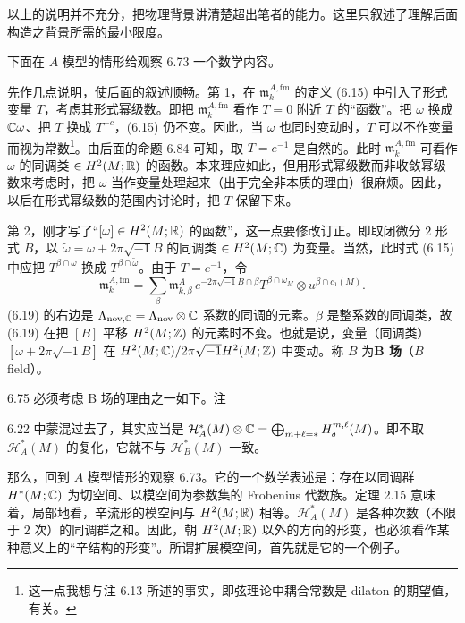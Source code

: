 以上的说明并不充分，把物理背景讲清楚超出笔者的能力。这里只叙述了理解后面构造之背景所需的最小限度。

下面在 $A$ 模型的情形给观察 6.73 一个数学内容。

先作几点说明，使后面的叙述顺畅。第 1，在 $\mathfrak{m}_k^{A,\mathrm{fm}}$ 的定义 (6.15) 中引入了形式变量 $T$，考虑其形式幂级数。即把 $\mathfrak{m}_k^{A,\mathrm{fm}}$ 看作 $T=0$ 附近 $T$ 的“函数”。把 $\omega$ 换成 $\mathbb{C}\omega$、把 $T$ 换成 $T^{-c}$，(6.15) 仍不变。因此，当 $\omega$ 也同时变动时，$T$ 可以不作变量而视为常数\footnote{这一点我想与注 6.13 所述的事实，即弦理论中耦合常数是 dilaton 的期望值，有关。}。由后面的命题 6.84 可知，取 $T=e^{-1}$ 是自然的。此时 $\mathfrak{m}_k^{A,\mathrm{fm}}$ 可看作 $\omega$ 的同调类 $\in H^2(M;\mathbb{R})$ 的函数。本来理应如此，但用形式幂级数而非收敛幂级数来考虑时，把 $\omega$ 当作变量处理起来（出于完全非本质的理由）很麻烦。因此，以后在形式幂级数的范围内讨论时，把 $T$ 保留下来。

第 2，刚才写了“$[\omega]\in H^2(M;\mathbb{R})$ 的函数”，这一点要修改订正。即取闭微分 $2$ 形式 $B$，以 $\tilde\omega=\omega+2\pi\sqrt{-1}B$ 的同调类 $\in H^2(M;\mathbb{C})$ 为变量。当然，此时式 (6.15) 中应把 $T^{\beta\cap\omega}$ 换成 $T^{\beta\cap\tilde\omega}$。由于 $T=e^{-1}$，令
\begin{equation}
  \mathfrak{m}_k^{A,\mathrm{fm}}
  =\sum_\beta\mathfrak{m}_{k,\beta}^A\,
  e^{-2\pi\sqrt{-1}B\cap\beta}T^{\beta\cap\omega_M}\otimes u^{\beta\cap c_1(M)} . \tag{6.19}
\end{equation}
(6.19) 的右边是 $\Lambda_{\mathrm{nov},\mathbb{C}}=\Lambda_{\mathrm{nov}}\otimes\mathbb{C}$ 系数的同调的元素。$\beta$ 是整系数的同调类，故 (6.19) 在把 $[B]$ 平移 $H^2(M;\mathbb{Z})$ 的元素时不变。也就是说，变量（同调类）$[\omega+2\pi\sqrt{-1}B]$ 在 $H^2(M;\mathbb{C})/2\pi\sqrt{-1}H^2(M;\mathbb{Z})$ 中变动。称 $B$ 为\textbf{B 场}（$B$ field）。

\begin{remark}{6.75}
  必须考虑 B 场的理由之一如下。注

  6.22 中蒙混过去了，其实应当是 $\mathcal{H}_A^*(M)\otimes\mathbb{C}=\bigoplus_{m+\ell=*}H_\delta^{m,\ell}(M)$。即不取 $\mathcal{H}_A^*(M)$ 的复化，它就不与 $\mathcal{H}_B^*(M)$ 一致。
\end{remark}

那么，回到 $A$ 模型情形的观察 6.73。它的一个数学表述是：存在以同调群 $H^*(M;\mathbb{C})$ 为切空间、以模空间为参数集的 Frobenius 代数族。定理 2.15 意味着，局部地看，辛流形的模空间与 $H^2(M;\mathbb{R})$ 相等。$\mathcal{H}_A^*(M)$ 是各种次数（不限于 $2$ 次）的同调群之和。因此，朝 $H^2(M;\mathbb{R})$ 以外的方向的形变，也必须看作某种意义上的“辛结构的形变”。所谓扩展模空间，首先就是它的一个例子。

